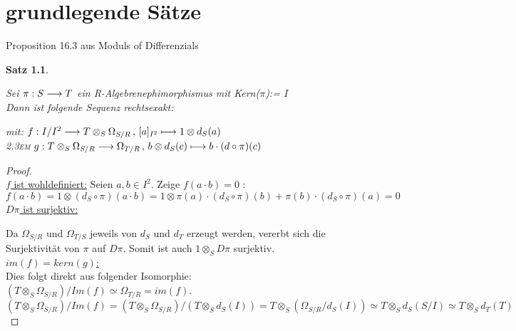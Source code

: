 \documentclass[10pt,a4paper]{report}
\newcounter{Aussage}[chapter]
\newtheorem{satz}[Aussage]{Satz}
\newcommand{\functionfront}[3]{\nolinebreak{#1:#2 \longrightarrow #3}}
\newcommand{\function}[5]{\nolinebreak{#1:#2 \longrightarrow #3 \, , \, #4 \longmapsto #5}}
\newcommand{\divR}[2]{\Omega_{#1/#2}}
\newcommand{\Tensor}[3]{#1 \otimes_{#2} #3}
\newcommand{\tensor}[3]{#1 \otimes #3}
\newcommand{\kernel}[1]{kern(#1)}
\newcommand{\immage}[1]{im(#1)}
\begin{document}
\chapter{grundlegende Sätze}
Proposition 16.3 aus Moduls of Differenzials
\begin{satz} \label{prop16.3}
\raggedright
Sei $\functionfront{\pi}{S}{T}$ ein R-Algebrenephimorphismus mit Kern($\pi$):= I \\
Dann ist folgende Sequenz rechtsexakt: \\
\begin{center}
\end{center}
\begin{spacing}{1.5}
mit: $\function{f}{I/I^2}{{\Tensor{T}{S}{\divR{S}{R}}}}{[a]_{I^2}}{\tensor{1}{S}{d_S(a)}}$\\
\textsc{\leftskip2.3em} $\function{g}{\Tensor{T}{S}{\divR{S}{R}}}{\divR{T}{R}}{\tensor{b}{S}{d_S(c)}}{b \cdot (d \circ \pi)(c)}$
\end{spacing}
\end{satz}

\begin{proof} \ \\
\underline{$f$ ist wohldefiniert:} Seien $a,b\in I^2$. Zeige $f(a \cdot b)=0$ :
$$ f(a \cdot b) =
\tensor{1}{S}{( d_S \circ \pi )(a \cdot b)} =
\tensor{1}{S}{\pi(a) \cdot (d_S \circ \pi )(b) + \pi(b) \cdot ( d_S \circ \pi )(a)} =0$$
\underline{$D\pi$ ist surjektiv:}

\begin{center}
\end{center}
Da $\divR{S}{R}$ und $\divR{T}{S}$ jeweils von $d_S$ und $d_T$ erzeugt werden, vererbt sich die Surjektivität von $\pi$ auf $D\pi$. Somit ist auch $\Tensor{1}{S}{D\pi}$ surjektiv.\\
\underline{$\immage{f}=\kernel{g}$:}\\ Dies folgt direkt aus folgender Isomorphie: $(\Tensor{T}{S}{\divR{S}{R}})/Im(f) \simeq \divR{T}{R} = \immage{f}$.
$$(\Tensor{T}{S}{\divR{S}{R}})/Im(f) = (\Tensor{T}{S}{\divR{S}{R}})/(\Tensor{T}{S}{d_S(I)}) = \Tensor{T}{S}{(\divR{S}{R}/d_S(I))} \simeq \Tensor{T}{S}{d_S(S/I)} \simeq \Tensor{T}{S}{d_T(T)}$$
\end{proof}
\end{document}
